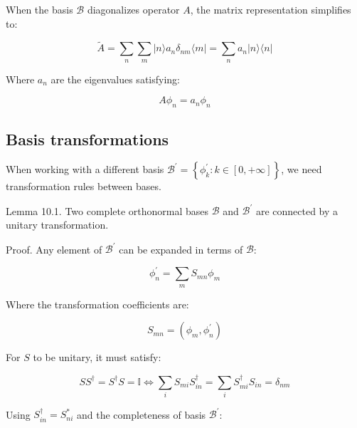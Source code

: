\documentclass[italian]{HKNdocument}
\begin{document}
When the basis $\mathcal{B}$ diagonalizes operator $A$, the matrix representation simplifies to:

\begin{equation}
\tilde{A}=\sum_{n} \sum_{m}|n\rangle a_{n} \delta_{n m}\langle m|=\sum_{n} a_{n}|n\rangle\langle n| \label{eq:10.9}
\end{equation}

Where $a_n$ are the eigenvalues satisfying:

\begin{equation}
A \phi_{n}=a_{n} \phi_{n} \label{eq:10.10}
\end{equation}

\subsection{Basis transformations}
When working with a different basis $\mathcal{B}^{\prime}=\left\{\phi_{k}^{\prime}: k \in[0,+\infty]\right\}$, we need transformation rules between bases.

Lemma 10.1. Two complete orthonormal bases $\mathcal{B}$ and $\mathcal{B}^{\prime}$ are connected by a unitary transformation.

Proof. Any element of $\mathcal{B}^{\prime}$ can be expanded in terms of $\mathcal{B}$:

\begin{equation}
\phi_{n}^{\prime}=\sum_{m} S_{m n} \phi_{m} \label{eq:10.11}
\end{equation}

Where the transformation coefficients are:

\begin{equation}
S_{m n}=\left(\phi_{m}, \phi_{n}^{\prime}\right) \label{eq:10.12}
\end{equation}

For $S$ to be unitary, it must satisfy:

\begin{equation}
S S^{\dagger}=S^{\dagger} S=\mathbb{I} \Longleftrightarrow \sum_{i} S_{m i} S_{i n}^{\dagger}=\sum_{i} S_{m i}^{\dagger} S_{i n}=\delta_{n m} \label{eq:10.13}
\end{equation}

Using $S_{i n}^{\dagger}=S_{n i}^{*}$ and the completeness of basis $\mathcal{B}^{\prime}$:
\end{document}

